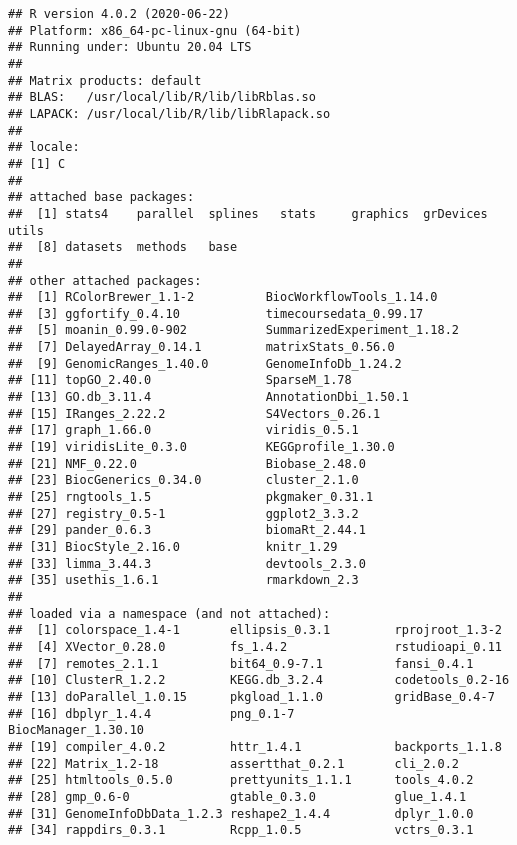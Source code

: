 \documentclass[9pt,a4paper,]{extarticle}
\begin{document}
\begin{verbatim}
## R version 4.0.2 (2020-06-22)
## Platform: x86_64-pc-linux-gnu (64-bit)
## Running under: Ubuntu 20.04 LTS
## 
## Matrix products: default
## BLAS:   /usr/local/lib/R/lib/libRblas.so
## LAPACK: /usr/local/lib/R/lib/libRlapack.so
## 
## locale:
## [1] C
## 
## attached base packages:
##  [1] stats4    parallel  splines   stats     graphics  grDevices utils    
##  [8] datasets  methods   base     
## 
## other attached packages:
##  [1] RColorBrewer_1.1-2          BiocWorkflowTools_1.14.0   
##  [3] ggfortify_0.4.10            timecoursedata_0.99.17     
##  [5] moanin_0.99.0-902           SummarizedExperiment_1.18.2
##  [7] DelayedArray_0.14.1         matrixStats_0.56.0         
##  [9] GenomicRanges_1.40.0        GenomeInfoDb_1.24.2        
## [11] topGO_2.40.0                SparseM_1.78               
## [13] GO.db_3.11.4                AnnotationDbi_1.50.1       
## [15] IRanges_2.22.2              S4Vectors_0.26.1           
## [17] graph_1.66.0                viridis_0.5.1              
## [19] viridisLite_0.3.0           KEGGprofile_1.30.0         
## [21] NMF_0.22.0                  Biobase_2.48.0             
## [23] BiocGenerics_0.34.0         cluster_2.1.0              
## [25] rngtools_1.5                pkgmaker_0.31.1            
## [27] registry_0.5-1              ggplot2_3.3.2              
## [29] pander_0.6.3                biomaRt_2.44.1             
## [31] BiocStyle_2.16.0            knitr_1.29                 
## [33] limma_3.44.3                devtools_2.3.0             
## [35] usethis_1.6.1               rmarkdown_2.3              
## 
## loaded via a namespace (and not attached):
##  [1] colorspace_1.4-1       ellipsis_0.3.1         rprojroot_1.3-2       
##  [4] XVector_0.28.0         fs_1.4.2               rstudioapi_0.11       
##  [7] remotes_2.1.1          bit64_0.9-7.1          fansi_0.4.1           
## [10] ClusterR_1.2.2         KEGG.db_3.2.4          codetools_0.2-16      
## [13] doParallel_1.0.15      pkgload_1.1.0          gridBase_0.4-7        
## [16] dbplyr_1.4.4           png_0.1-7              BiocManager_1.30.10   
## [19] compiler_4.0.2         httr_1.4.1             backports_1.1.8       
## [22] Matrix_1.2-18          assertthat_0.2.1       cli_2.0.2             
## [25] htmltools_0.5.0        prettyunits_1.1.1      tools_4.0.2           
## [28] gmp_0.6-0              gtable_0.3.0           glue_1.4.1            
## [31] GenomeInfoDbData_1.2.3 reshape2_1.4.4         dplyr_1.0.0           
## [34] rappdirs_0.3.1         Rcpp_1.0.5             vctrs_0.3.1           

\end{verbatim}
\end{document}
